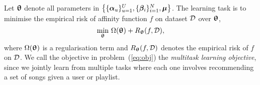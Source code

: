 %







Let ${\bm{\uptheta}}$ denote all parameters in $\left\{ \{{\bm{\alpha}}_u\}_{u=1}^U, \{{\bm{\beta}}_i\}_{i=1}^N, \bm{\mu} \right\}$.
The learning task is to minimise the empirical risk of affinity function $f$ on dataset $\mathcal{D}$ over ${\bm{\uptheta}}$,
\ie %
\begin{equation}
\label{eq:obj}
\min_{\bm{\uptheta}} \, \Omega({\bm{\uptheta}}) + R_{\bm{\uptheta}}(f, \mathcal{D}),
\end{equation}
where $\Omega({\bm{\uptheta}})$ is a regularisation term and $R_{\bm{\uptheta}}(f, \mathcal{D})$ denotes the empirical risk
of $f$ on $\mathcal{D}$.
We call the objective in problem~(\ref{eq:obj}) the {\it multitask learning objective},
since we jointly learn from multiple tasks where each one involves recommending a set of songs 
given a user or playlist.


